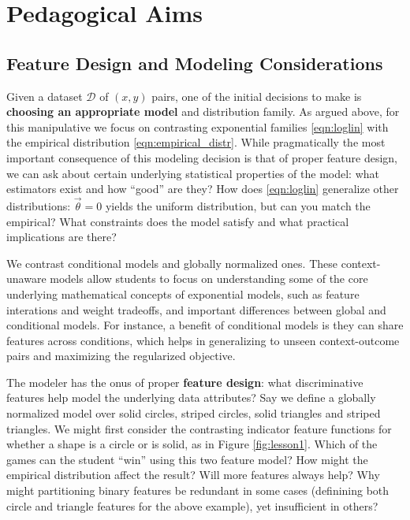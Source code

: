 \documentclass[11pt,letterpaper]{article}
\newcommand{\Data}[0]{\ensuremath{\mathcal{D}}}
\begin{document}

\section{Pedagogical Aims}\label{sec:aims}

\subsection{Feature Design and Modeling Considerations}

Given a dataset $\Data{}$ of $(x, y)$ pairs, one of the initial decisions 
to make is \textbf{choosing an appropriate model} and distribution family. 
As argued above, for this manipulative we focus on contrasting exponential families 
\eqref{eqn:loglin} with the empirical distribution \eqref{eqn:empirical_distr}. While pragmatically the most important 
consequence of this modeling decision is that of proper feature design, we can ask about 
certain underlying statistical properties of the model: what estimators 
exist and how ``good'' are they? How does \eqref{eqn:loglin} generalize other 
distributions: $\vec{\theta} = 0$ yields the uniform distribution, but can you match 
the empirical? What constraints does the model satisfy and what practical implications
are there?
 
We contrast conditional models and globally normalized ones. 
These context-unaware models allow students to focus on
understanding some of the core underlying mathematical concepts of
exponential models, such as feature interations and weight tradeoffs,
and important differences between global and conditional models. 
For instance, a benefit of conditional models is they can share 
features across conditions, which helps in generalizing to unseen context-outcome 
pairs and maximizing the regularized objective.

The modeler has the onus of proper \textbf{feature design}: what discriminative features 
help model the underlying data attributes? Say we define a globally 
normalized model over solid circles, striped circles, solid triangles and striped triangles. 
We might first consider the contrasting indicator feature functions for whether a shape
is a circle or is solid, as in Figure \ref{fig:lesson1}. Which of the games can the student 
``win'' using this two feature model? How might the empirical distribution affect the result? 
Will more features always help? Why might partitioning binary 
features be redundant in some cases (definining both circle and triangle features for the above example), 
yet insufficient in others?
\end{document}
